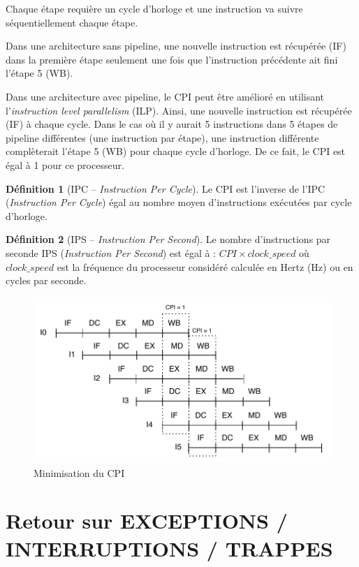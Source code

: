 \documentclass[11pt,english,french]{scrreprt}
\theoremstyle{remark}
\theoremstyle{definition}
\newtheorem*{def*}{Définition}
\begin{document}
Chaque étape requière un cycle d'horloge et une instruction va suivre séquentiellement chaque étape.

	Dans une architecture sans pipeline, une nouvelle instruction est récupérée (IF) dans la première étape seulement une fois que l'instruction précédente ait fini l'étape 5 (WB).
	
	Dans une architecture avec pipeline, le CPI peut être amélioré en utilisant l'\emph{instruction level parallelism} (ILP). Ainsi, une nouvelle instruction est récupérée (IF) à chaque cycle. Dans le cas où  il y aurait 5 instructions dans 5 étapes de pipeline différentes (une instruction par étape), une instruction différente complèterait l'étape 5 (WB) pour chaque cycle d'horloge. De ce fait, le CPI est égal à 1 pour ce processeur.

\begin{def*}[IPC -- \emph{Instruction Per Cycle}]
	Le CPI est l'inverse de l'IPC (\emph{Instruction Per Cycle}) égal au nombre moyen d'instructions exécutées par cycle d'horloge.
\end{def*}

\begin{def*}[IPS -- \emph{Instruction Per Second}]
	Le nombre d'instructions par seconde IPS (\emph{Instruction Per Second}) est égal à : $CPI \times clock\_speed$ où $clock\_speed$ est la fréquence du processeur considéré calculée en Hertz (Hz) ou en cycles par seconde.
\end{def*}

\begin{figure}[!h]
	\center
	\includegraphics[scale=.65]{diagrammes/pipeline}
	\caption{Minimisation du CPI}
\end{figure}


\chapter{Retour sur EXCEPTIONS / INTERRUPTIONS / TRAPPES}
\end{document}
